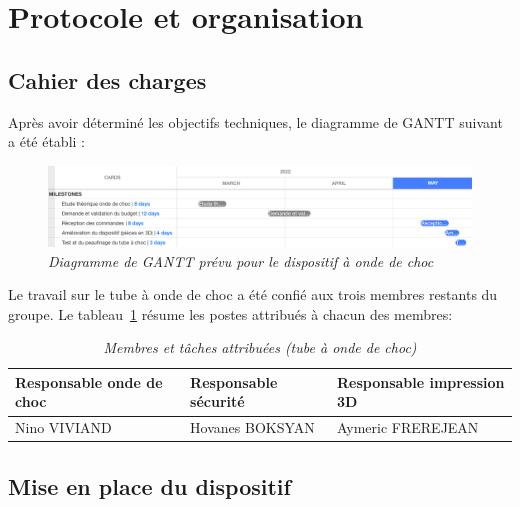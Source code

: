 \section{Protocole et organisation}
\subsection{Cahier des charges}
Après avoir déterminé les objectifs techniques, le diagramme de GANTT suivant a été établi :
\begin{figure}[H]
	\centering
	\includegraphics[scale = 0.4]{figures/gantt_choc.png}
	\caption{\small{\textit{Diagramme de GANTT prévu pour le dispositif à onde de choc}}}
	\label{fig:gantt_choc}
\end{figure}
Le travail sur le tube à onde de choc a été confié aux trois membres restants du groupe. Le tableau~\ref{tab:gestion_choc} résume les postes attribués à chacun des membres:
\begin{table}[H]
	\centering
	\begin{tabular}{|l l l|}
		\hline
		\small\textbf{Responsable onde de choc}&\small\textbf{Responsable sécurité}&\small\textbf{Responsable impression 3D}\\
		\hline
		\small{Nino VIVIAND}&\small{Hovanes BOKSYAN}&\small{Aymeric FREREJEAN}\\
		\hline
	\end{tabular}
	\caption{\small\textit{Membres et tâches attribuées (tube à onde de choc)}}
	\label{tab:gestion_choc}
\end{table}
\subsection{Mise en place du dispositif}
